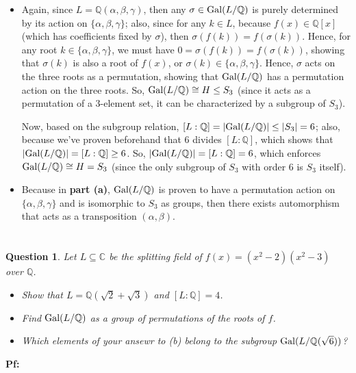 \documentclass{article}
\newtheorem{question}{Question}
\newcommand{\QQ}{\mathbb{Q}}
\newcommand{\CC}{\mathbb{C}}
\newcommand{\Gal}{\textmd{Gal}}
\begin{document}
\begin{itemize}
    \item[(a)] Again, since $L=\QQ(\alpha,\beta,\gamma)$, then any $\sigma\in \Gal(L/\QQ)$ is purely determined by its action on $\{\alpha,\beta,\gamma\}$; also, since for any $k\in L$, because $f(x)\in \QQ[x]$ (which has coefficients fixed by $\sigma$), then $\sigma(f(k))=f(\sigma(k))$. Hence, for any root $k\in\{\alpha,\beta,\gamma\}$, we must have $0=\sigma(f(k))=f(\sigma(k))$, showing that $\sigma(k)$ is also a root of $f(x)$, or $\sigma(k)\in\{\alpha,\beta,\gamma\}$. Hence, $\sigma$ acts on the three roots as a permutation, showing that $\Gal(L/\QQ)$ has a permutation action on the three roots. So, $\Gal(L/\QQ)\cong H\leq S_3$ (since it acts as a permutation of a $3$-element set, it can be characterized by a subgroup of $S_3$).
    
    Now, based on the subgroup relation, $[L:\QQ]=|\Gal(L/\QQ)| \leq |S_3| = 6$; also, because we've proven beforehand that $6$ divides $[L:\QQ]$, which shows that $|\Gal(L/\QQ)|=[L:\QQ]\geq 6$. So, $|\Gal(L/\QQ)| = [L:\QQ]=6$, which enforces $\Gal(L/\QQ)\cong H=S_3$ (since the only subgroup of $S_3$ with order $6$ is $S_3$ itself).
    \item[(b)] Because in \textbf{part (a)}, $\Gal(L/\QQ)$ is proven to have a permutation action on $\{\alpha,\beta,\gamma\}$ and is isomorphic to $S_3$ as groups, then there exists automorphism that acts as a transposition $(\alpha,\beta)$.
\end{itemize}

\break

\section{}%
\begin{question}\label{q4}
    Let $L\subseteq \CC$ be the splitting field of $f(x)=(x^2-2)(x^2-3)$ over $\QQ$.
    \begin{itemize}
        \item[(a)] Show that $L=\QQ(\sqrt{2}+\sqrt{3})$ and $[L:\QQ]=4$.
        \item[(b)] Find $\Gal(L/\QQ)$ as a group of permutations of the roots of $f$.
        \item[(c)] Which elements of your ansewr to (b) belong to the subgroup $\Gal(L/\QQ(\sqrt{6}))$?  
    \end{itemize}
\end{question}

\textbf{Pf:}
\end{document}
